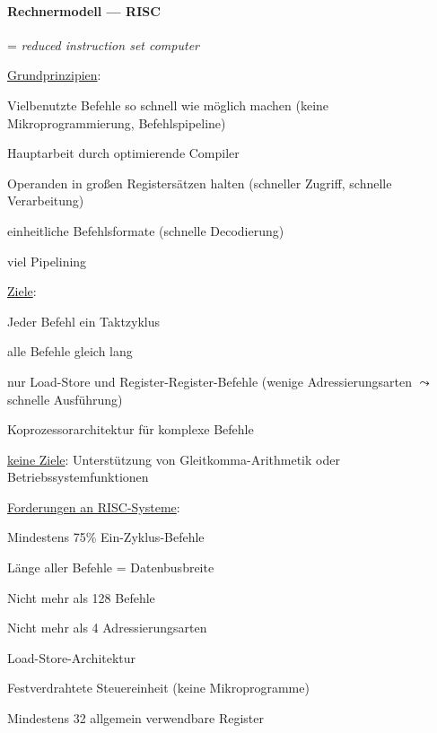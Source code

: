\paragraph{Rechnermodell --- RISC}
\begin{items}
	\item = \emph{reduced instruction set computer}
	\item \underline{Grundprinzipien}:
	\begin{enumeration}
	 	\item Vielbenutzte Befehle so schnell wie möglich machen (keine Mikroprogrammierung, Befehlspipeline)
	 	\item Hauptarbeit durch optimierende Compiler
	 	\item Operanden in großen Registersätzen halten (schneller Zugriff, schnelle Verarbeitung)
	 	\item einheitliche Befehlsformate (schnelle Decodierung)
	 	\item viel Pipelining
	 \end{enumeration}
	\item \underline{Ziele}:
	\begin{enumeration}
		\item Jeder Befehl ein Taktzyklus
		\item alle Befehle gleich lang
		\item nur Load-Store und Register-Register-Befehle (wenige Adressierungsarten $\leadsto$ schnelle Ausführung)
		\item Koprozessorarchitektur für komplexe Befehle
	\end{enumeration}
	\item \underline{keine Ziele}: Unterstützung von Gleitkomma-Arithmetik oder Betriebssystemfunktionen
	\item \underline{Forderungen an RISC-Systeme}: 
	\begin{enumeration}
		\item Mindestens 75\% Ein-Zyklus-Befehle
		\item Länge aller Befehle = Datenbusbreite
		\item Nicht mehr als 128 Befehle
		\item Nicht mehr als 4 Adressierungsarten
		\item Load-Store-Architektur
		\item Festverdrahtete Steuereinheit (keine Mikroprogramme)
		\item Mindestens 32 allgemein verwendbare Register
	\end{enumeration}
\end{items}


